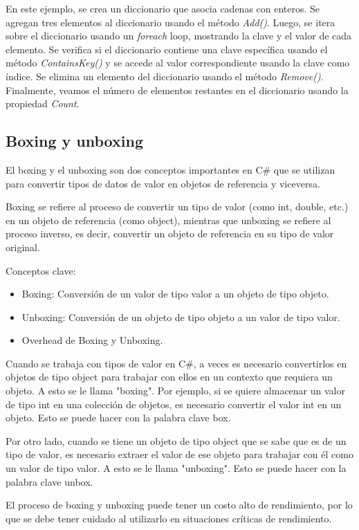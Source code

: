 \documentclass[executivepaper]{article}
\begin{document}
En este ejemplo, se crea un diccionario que asocia cadenas con enteros. Se agregan tres elementos al diccionario usando el método \emph{Add()}. Luego, se itera sobre el diccionario usando un \emph{foreach} loop, mostrando la clave y el valor de cada elemento. Se verifica si el diccionario contiene una clave específica usando el método \emph{ContainsKey()} y se accede al valor correspondiente usando la clave como índice. Se elimina un elemento del diccionario usando el método \emph{Remove()}. Finalmente, veamos el número de elementos restantes en el diccionario usando la propiedad \emph{Count}.

\subsection*{Boxing y unboxing}

El boxing y el unboxing son dos conceptos importantes en C\# que se utilizan para convertir tipos de datos de valor en objetos de referencia y viceversa.

Boxing se refiere al proceso de convertir un tipo de valor (como int, double, etc.) en un objeto de referencia (como object), mientras que unboxing se refiere al proceso inverso, es decir, convertir un objeto de referencia en su tipo de valor original.

Conceptos clave:
\begin{itemize}
\item Boxing: Conversión de un valor de tipo valor a un objeto de tipo objeto.
\item Unboxing: Conversión de un objeto de tipo objeto a un valor de tipo valor.
\item Overhead de Boxing y Unboxing.
\end{itemize}

Cuando se trabaja con tipos de valor en C\#, a veces es necesario convertirlos en objetos de tipo object para trabajar con ellos en un contexto que requiera un objeto. A esto se le llama "boxing". Por ejemplo, si se quiere almacenar un valor de tipo int en una colección de objetos, es necesario convertir el valor int en un objeto. Esto se puede hacer con la palabra clave box.

Por otro lado, cuando se tiene un objeto de tipo object que se sabe que es de un tipo de valor, es necesario extraer el valor de ese objeto para trabajar con él como un valor de tipo valor. A esto se le llama "unboxing". Esto se puede hacer con la palabra clave unbox.

El proceso de boxing y unboxing puede tener un costo alto de rendimiento, por lo que se debe tener cuidado al utilizarlo en situaciones críticas de rendimiento.
\end{document}
